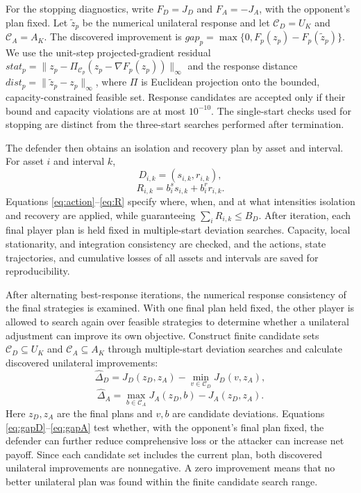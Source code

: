 \documentclass[conference,letterpaper]{IEEEtran}
\begin{document}
For the stopping diagnostics, write $F_D=J_D$ and $F_A=-J_A$, with the opponent's plan fixed. Let $\widetilde z_p$ be the numerical unilateral response and let $\mathcal C_D=U_K$ and $\mathcal C_A=A_K$. The discovered improvement is $gap_p=\max\{0,F_p(z_p)-F_p(\widetilde z_p)\}$. We use the unit-step projected-gradient residual $stat_p=\|z_p-\Pi_{\mathcal C_p}(z_p-\nabla F_p(z_p))\|_\infty$ and the response distance $dist_p=\|\widetilde z_p-z_p\|_\infty$, where $\Pi$ is Euclidean projection onto the bounded, capacity-constrained feasible set. Response candidates are accepted only if their bound and capacity violations are at most $10^{-10}$. The single-start checks used for stopping are distinct from the three-start searches performed after termination.

The defender then obtains an isolation and recovery plan by asset and interval. For asset $i$ and interval $k$,
\begin{equation}\label{eq:action}
D_{i,k}=(s_{i,k},r_{i,k}),
\end{equation}
\begin{equation}\label{eq:R}
R_{i,k}=b_i^s s_{i,k}+b_i^r r_{i,k}.
\end{equation}
Equations \eqref{eq:action}--\eqref{eq:R} specify where, when, and at what intensities isolation and recovery are applied, while guaranteeing $\sum_i R_{i,k}\le B_D$. After iteration, each final player plan is held fixed in multiple-start deviation searches. Capacity, local stationarity, and integration consistency are checked, and the actions, state trajectories, and cumulative losses of all assets and intervals are saved for reproducibility.

After alternating best-response iterations, the numerical response consistency of the final strategies is examined. With one final plan held fixed, the other player is allowed to search again over feasible strategies to determine whether a unilateral adjustment can improve its own objective. Construct finite candidate sets $\mathcal C_D\subseteq U_K$ and $\mathcal C_A\subseteq A_K$ through multiple-start deviation searches and calculate discovered unilateral improvements:
\begin{equation}\label{eq:gapD}
\widehat\Delta_D=J_D(z_D,z_A)-\min_{v\in\mathcal C_D}J_D(v,z_A),
\end{equation}
\begin{equation}\label{eq:gapA}
\widehat\Delta_A=\max_{b\in\mathcal C_A}J_A(z_D,b)-J_A(z_D,z_A).
\end{equation}
Here $z_D,z_A$ are the final plans and $v,b$ are candidate deviations. Equations \eqref{eq:gapD}--\eqref{eq:gapA} test whether, with the opponent's final plan fixed, the defender can further reduce comprehensive loss or the attacker can increase net payoff. Since each candidate set includes the current plan, both discovered unilateral improvements are nonnegative. A zero improvement means that no better unilateral plan was found within the finite candidate search range.
\end{document}
